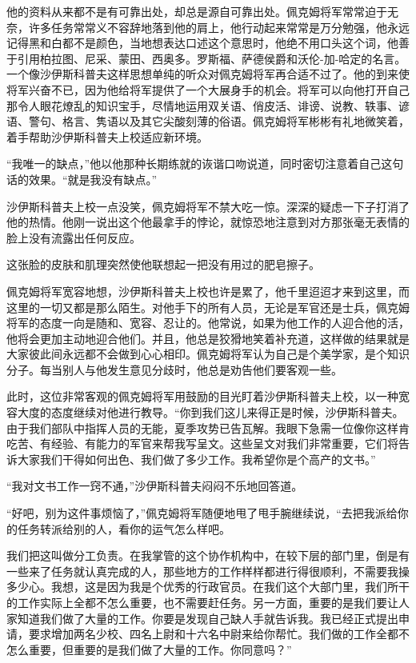     他的资料从来都不是有可靠出处，却总是源自可靠出处。佩克姆将军常常迫于无奈，许多任务常常义不容辞地落到他的肩上，他行动起来常常是万分勉强，他永远记得黑和白都不是颜色，当地想表达口述这个意思时，他绝不用口头这个词，他善于引用柏拉图、尼采、蒙田、西奥多。罗斯福、萨德侯爵和沃伦-加-哈定的名言。一个像沙伊斯科普夫这样思想单纯的听众对佩克姆将军再合适不过了。他的到来使将军兴奋不已，因为他给将军提供了一个大展身手的机会。将军可以向他打开自己那令人眼花燎乱的知识宝手，尽情地运用双关语、俏皮活、诽谤、说教、轶事、谚语、警句、格言、隽语以及其它尖酸刻薄的俗语。佩克姆将军彬彬有礼地微笑着，着手帮助沙伊斯科普夫上校适应新环境。

    “我唯一的缺点，”他以他那种长期练就的诙谐口吻说道，同时密切注意着自己这句话的效果。“就是我没有缺点。”

 


    沙伊斯科普夫上校一点没笑，佩克姆将军不禁大吃一惊。深深的疑虑一下子打消了他的热情。他刚一说出这个他最拿手的悖论，就惊恐地注意到对方那张毫无表情的脸上没有流露出任何反应。

    这张脸的皮肤和肌理突然使他联想起一把没有用过的肥皂擦子。

    佩克姆将军宽容地想，沙伊斯科普夫上校也许是累了，他千里迢迢才来到这里，而这里的一切又都是那么陌生。对他手下的所有人员，无论是军官还是士兵，佩克姆将军的态度一向是随和、宽容、忍让的。他常说，如果为他工作的人迎合他的活，他将会更加主动地迎合他们。并且，他总是狡猾地笑着补充道，这样做的结果就是大家彼此间永远都不会做到心心相印。佩克姆将军认为自己是个美学家，是个知识分子。每当别人与他发生意见分歧时，他总是劝告他们要客观一些。

    此时，这位非常客观的佩克姆将军用鼓励的目光盯着沙伊斯科普夫上校，以一种宽容大度的态度继续对他进行教导。“你到我们这儿来得正是时候，沙伊斯科普夫。由于我们部队中指挥人员的无能，夏季攻势已告瓦解。我眼下急需一位像你这样肯吃苦、有经验、有能力的军官来帮我写呈文。这些呈文对我们非常重要，它们将告诉大家我们干得如何出色、我们做了多少工作。我希望你是个高产的文书。”

    “我对文书工作一窍不通，”沙伊斯科普夫闷闷不乐地回答道。

    “好吧，别为这件事烦恼了，”佩克姆将军随便地甩了甩手腕继续说，“去把我派给你的任务转派给别的人，看你的运气怎么样吧。

    我们把这叫做分工负责。在我掌管的这个协作机构中，在较下层的部门里，倒是有一些来了任务就认真完成的人，那些地方的工作样样都进行得很顺利，不需要我操多少心。我想，这是因为我是个优秀的行政官员。在我们这个大部门里，我们所干的工作实际上全都不怎么重要，也不需要赶任务。另一方面，重要的是我们要让人家知道我们做了大量的工作。你要是发现自己缺人手就告诉我。我已经正式提出申请，要求增加两名少校、四名上尉和十六名中尉来给你帮忙。我们做的工作全都不怎么重要，但重要的是我们做了大量的工作。你同意吗？”

